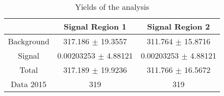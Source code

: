 \documentclass[10pt]{article}
\begin{document}
\begin{table}[htbp]
\begin{center}
\begin{tabular}{|c|c|c|}
\hline 
 & Signal Region 1 & Signal Region 2\\
\hline 
  Background   & \num[round-mode=figures,round-precision=3]{317.186} $\pm$ \num[round-mode=figures,round-precision=3]{19.3557} & \num[round-mode=figures,round-precision=3]{311.764} $\pm$ \num[round-mode=figures,round-precision=3]{15.8716} \\ 
  Signal   & \num[round-mode=figures,round-precision=3]{0.00203253} $\pm$ \num[round-mode=figures,round-precision=3]{4.88121} & \num[round-mode=figures,round-precision=3]{0.00203253} $\pm$ \num[round-mode=figures,round-precision=3]{4.88121} \\ 
\hline 
  Total  & \num[round-mode=figures,round-precision=3]{317.189} $\pm$ \num[round-mode=figures,round-precision=3]{19.9236} & \num[round-mode=figures,round-precision=3]{311.766} $\pm$ \num[round-mode=figures,round-precision=3]{16.5672} \\ 
\hline 
  Data 2015   & 319 & 319 \\ 
\hline 
\end{tabular} 
\caption{Yields of the analysis} 
\end{center} 
\end{table} 
\end{document}
